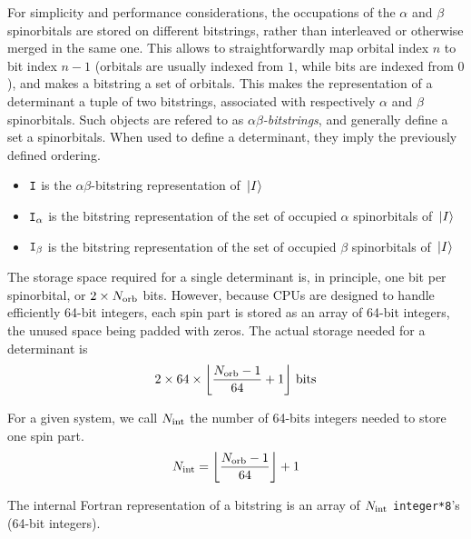 For simplicity and performance considerations, the occupations of the $\alpha$ and $\beta$ spinorbitals are stored on different bitstrings, rather than interleaved or otherwise merged in the same one. This allows to straightforwardly map orbital index $n$ to bit index $n-1$ (orbitals are usually indexed from $1$, while bits are indexed from $0$), and makes a bitstring a set of orbitals.
This makes the representation of a determinant a tuple of two bitstrings, associated with respectively $\alpha$ and $\beta$ spinorbitals. Such objects are refered to as \emph{$\alpha \beta$-bitstrings}, and generally define a set a spinorbitals. When used to define a determinant, they imply the previously defined ordering.


\begin{itemize}
\item
${\texttt{I}}$ is the $\alpha \beta$-bitstring representation of ${\ket*{I}}$
\item
${\texttt{I}}_\alpha$ is the bitstring representation of the set of occupied $\alpha$ spinorbitals of ${\ket*{I}}$ 
\item
${\texttt{I}}_\beta$ is the bitstring representation of the set of occupied $\beta$ spinorbitals of ${\ket*{I}}$ 

\end{itemize}


The storage space required for a single determinant is, in principle, one bit per spinorbital, or $2 \times {N_\text{orb}}$ bits. However, because CPUs are designed to handle efficiently 64-bit integers, each spin part is stored as an array of 64-bit integers, the unused space being padded with zeros. 
The actual storage needed for a determinant is
$$
2 \times 64 \times  \left \lfloor \frac{{N_\text{orb}}-1}{64} + 1 \right \rfloor \, \text{bits}
\label{determinantstoragespace}
$$

For a given system, we call ${N_\text{int}}$ the number of 64-bits integers needed to store one spin part.
\begin{equation}
{N_\text{int}} = \left \lfloor \frac{{N_\text{orb}}-1}{64} \right \rfloor + 1
\end{equation}


The internal Fortran representation of a bitstring is an array of ${N_\text{int}}$ \lstinline{integer*8}'s (64-bit integers).

